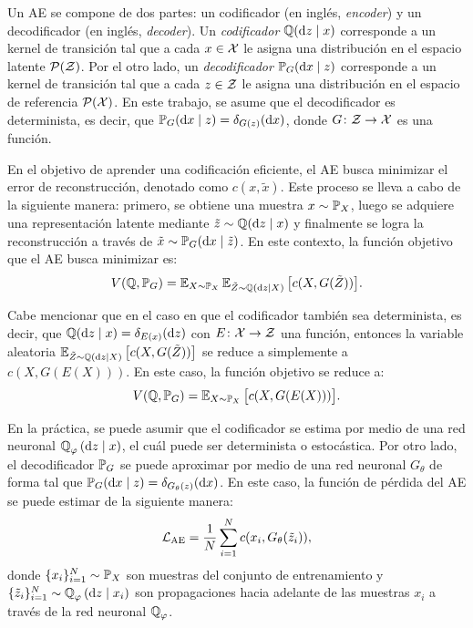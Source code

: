 Un AE se compone de dos partes: un codificador (en inglés, \textit{encoder}) y un decodificador (en inglés, \textit{decoder}).
Un \textit{codificador} $ \ProbQ(\dz \mid x)$ corresponde a un kernel de transición tal que a cada $x \in \cX$ le asigna una distribución en el espacio latente $ \ProbSpace[\cZ] $.
Por el otro lado, un \textit{decodificador} $\Prob_G(\dx \mid z)$ corresponde a un kernel de transición tal que a cada $z \in \cZ$ le asigna una distribución en el espacio de referencia $\ProbSpace[\cX]$.
En este trabajo, se asume que el decodificador es determinista, es decir, que $\Prob_G(\dx \mid z) = \delta_{G(z)}(\dx)$, donde $G\colon \cZ \to \cX$ es una función.

En el objetivo de aprender una codificación eficiente, el AE busca minimizar el error de reconstrucción, denotado como $c(x, \tilde x)$. Este proceso se lleva a cabo de la siguiente manera: primero, se obtiene una muestra $x\sim \Prob_X$, luego se adquiere una representación latente mediante $\tilde z \sim \ProbQ(\dz \mid x)$ y finalmente se logra la reconstrucción a través de $\tilde x \sim \Prob_G(\dx \mid \tilde z)$. En este contexto, la función objetivo que el AE busca minimizar es:
\begin{equation}\label{eq:ae-obj-func}
	V(\ProbQ, \Prob_G) = \Exp_{X \sim \Prob_X} \Exp_{\tilde Z \sim \ProbQ(\dz \mid X)} \qty\big[ c(X, G(\tilde Z)) ].
\end{equation}

Cabe mencionar que en el caso en que el codificador también sea determinista, es decir, que $\ProbQ(\dz \mid x) = \delta_{E(x)}(\dz)$ con $E\colon \cX \to \cZ$ una función, entonces la variable aleatoria
$\Exp_{\tilde Z \sim \ProbQ(\dz \mid X)} \qty\big[ c(X, G(\tilde Z)) ]$ se reduce a simplemente a $c(X, G(E(X)))$. En este caso, la función objetivo se reduce a:
\begin{equation}\label{eq:ae-obj-func-deterministic}
	V(\ProbQ, \Prob_G) = \Exp_{X \sim \Prob_X} \qty\big[ c(X, G(E(X))) ].
\end{equation}

En la práctica, se puede asumir que el codificador se estima por medio de una red neuronal $\ProbQ_\varphi \left( \dd z \mid x \right)$, el cuál puede ser determinista o estocástica. Por otro lado, el decodificador $\Prob_G$ se puede aproximar por medio de una red neuronal $G_\theta$ de forma tal que $\Prob_G(\dd x \mid z) = \delta_{G_\theta(z)}(\dd x)$.
En este caso, la función de pérdida del AE se puede estimar de la siguiente manera:
\begin{equation}
	\cL_{\mathrm{AE}} = \frac{1}{N}\sum_{i=1}^{N} c(x_i, G_\theta(\tilde z_i)),
\end{equation}
donde $\{x_i\}_{i=1}^{N} \sim \Prob_X$ son muestras del conjunto de entrenamiento y $\{\tilde z_i\}_{i=1}^{N} \sim \ProbQ_\varphi \left( \dd z \mid x_i \right)$ son propagaciones hacia adelante de las muestras $x_i$ a través de la red neuronal $\ProbQ_\varphi$.

